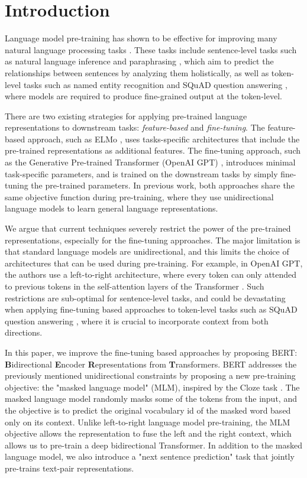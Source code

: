 
\section{Introduction}

Language model pre-training has shown to be effective for improving many natural language processing tasks \citep{Andrew2015, Matthew2017, Matthew2018, Alec2018, Jeremy2018}. These tasks include sentence-level tasks such as natural language inference \citep{Samuel2015, Adina2018} and paraphrasing \citep{William2005}, which aim to predict the relationships between sentences by analyzing them holistically, as well as token-level tasks such as named entity recognition \citep{Erik2003} and SQuAD question answering \citep{Pranav2016}, where models are required to produce fine-grained output at the token-level.

There are two existing strategies for applying pre-trained language representations to downstream tasks: \emph{feature-based} and \emph{fine-tuning}. The feature-based approach, such as ELMo \citep{Matthew2018}, uses tasks-specific architectures that include the pre-trained representations as additional features. The fine-tuning approach, such as the Generative Pre-trained Transformer (OpenAI GPT) \citep{Alec2018}, introduces minimal task-specific parameters, and is trained on the downstream tasks by simply fine-tuning the pre-trained parameters. In previous work, both approaches share the same objective function during pre-training, where they use unidirectional language models to learn general language representations.

We argue that current techniques severely restrict the power of the pre-trained representations, especially for the fine-tuning approaches. The major limitation is that standard language models are unidirectional, and this limits the choice of architectures that can be used during pre-training. For example, in OpenAI GPT, the authors use a left-to-right architecture, where every token can only attended to previous tokens in the self-attention layers of the Transformer \citep{Ashish2017}. Such restrictions are sub-optimal for sentence-level tasks, and could be devastating when applying fine-tuning based approaches to token-level tasks such as SQuAD question answering \citep{Pranav2016}, where it is crucial to incorporate context from both directions.

In this paper, we improve the fine-tuning based approaches by proposing BERT: \textbf{B}idirectional \textbf{E}ncoder \textbf{R}epresentations from \textbf{T}ransformers. BERT addresses the previously mentioned unidirectional constraints by proposing a new pre-training objective: the "masked language model" (MLM), inspired by the Cloze task \citep{Wilson1953}. The masked language model randomly masks some of the tokens from the input, and the objective is to predict the original vocabulary id of the masked word based only on its context. Unlike left-to-right language model pre-training, the MLM objective allows the representation to fuse the left and the right context, which allows us to pre-train a deep bidirectional Transformer. In addition to the masked language model, we also introduce a "next sentence prediction" task that jointly pre-trains text-pair representations. 

